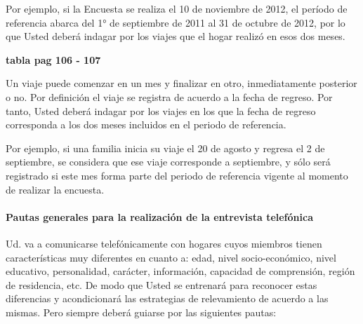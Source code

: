 \documentclass[
  openany]{book}
\begin{document}
Por ejemplo, si la Encuesta se realiza el 10 de noviembre de 2012, el período de referencia abarca del 1° de septiembre de 2011 al 31 de octubre de 2012, por lo que Usted deberá indagar por los viajes que el hogar realizó en esos dos meses.

\textbf{tabla pag 106 - 107}

Un viaje puede comenzar en un mes y finalizar en otro, inmediatamente posterior o no. Por definición el viaje se registra de acuerdo a la fecha de regreso. Por tanto, Usted deberá indagar por los viajes en los que la fecha de regreso corresponda a los dos meses incluidos en el periodo de referencia.

Por ejemplo, si una familia inicia su viaje el 20 de agosto y regresa el 2 de septiembre, se considera que ese viaje corresponde a septiembre, y sólo será registrado si este mes forma parte del periodo de referencia vigente al momento de realizar la encuesta.

\hypertarget{pautas-generales-para-la-realizaciuxf3n-de-la-entrevista-telefuxf3nica}{%
\paragraph{Pautas generales para la realización de la entrevista telefónica}\label{pautas-generales-para-la-realizaciuxf3n-de-la-entrevista-telefuxf3nica}}

Ud. va a comunicarse telefónicamente con hogares cuyos miembros tienen características muy diferentes en cuanto a: edad, nivel socio-económico, nivel educativo, personalidad, carácter, información, capacidad de comprensión, región de residencia, etc. De modo que Usted se entrenará para reconocer estas diferencias y acondicionará las estrategias de relevamiento de acuerdo a las mismas. Pero siempre deberá guiarse por las siguientes pautas:
\end{document}
